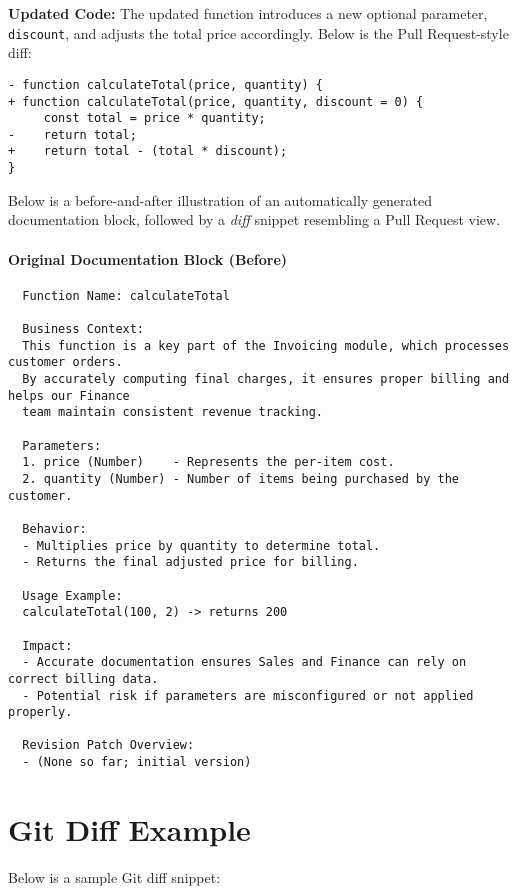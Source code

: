 \documentclass[12pt,oneside]{article}
\begin{document}
\noindent\textbf{Updated Code:}
The updated function introduces a new optional parameter, \texttt{discount}, and adjusts the total price accordingly.
Below is the Pull Request-style diff:

\begin{verbatim}
- function calculateTotal(price, quantity) {
+ function calculateTotal(price, quantity, discount = 0) {
     const total = price * quantity;
-    return total;
+    return total - (total * discount);
}
\end{verbatim}

Below is a before-and-after illustration of an automatically generated documentation block, followed by a \emph{diff} 
snippet resembling a Pull Request view.

\paragraph{Original Documentation Block (Before)}
\begin{verbatim}
  Function Name: calculateTotal
  
  Business Context:
  This function is a key part of the Invoicing module, which processes customer orders.
  By accurately computing final charges, it ensures proper billing and helps our Finance
  team maintain consistent revenue tracking.
  
  Parameters:
  1. price (Number)    - Represents the per-item cost.
  2. quantity (Number) - Number of items being purchased by the customer.
  
  Behavior:
  - Multiplies price by quantity to determine total.
  - Returns the final adjusted price for billing.
  
  Usage Example:
  calculateTotal(100, 2) -> returns 200
  
  Impact:
  - Accurate documentation ensures Sales and Finance can rely on correct billing data.
  - Potential risk if parameters are misconfigured or not applied properly.
  
  Revision Patch Overview:
  - (None so far; initial version)
\end{verbatim}


\section*{Git Diff Example}

Below is a sample Git diff snippet:
\end{document}
